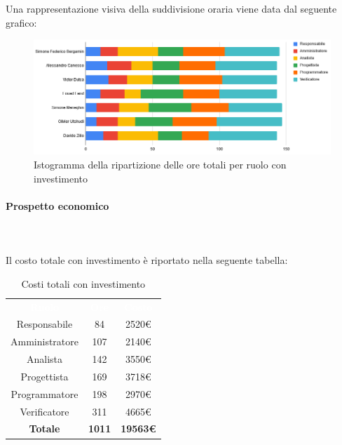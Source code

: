 Una rappresentazione visiva della suddivisione oraria viene data dal seguente grafico:
\begin{figure}[H]
\centering
\includegraphics[scale=0.60]{img/grafici/tabella_tot_con_analisi.png}
\caption{Istogramma della ripartizione delle ore totali per ruolo con investimento}
\end{figure}

\paragraph{Prospetto economico} \mbox{} \\ \mbox{} \\
Il costo totale con investimento è riportato nella seguente tabella:

\begin{table}[H]
\centering\renewcommand{\arraystretch}{1.5}
\caption{Costi totali con investimento}
\vspace{0.2cm}
\begin{tabular}{ c c c }
\rowcolor{redafk}
\textcolor{white}{\textbf{Ruolo}} & \textcolor{white}{\textbf{Ore}} & 
\textcolor{white}{\textbf{Costo}}  \\
Responsabile & 84 & 2520€ \\
Amministratore & 107 & 2140€ \\
Analista & 142 & 3550€ \\
Progettista	& 169 & 3718€ \\
Programmatore & 198 & 2970€  \\
Verificatore & 311 & 4665€  \\
\rowcolor{lastrowcolor}
\textbf{Totale} & \textbf{1011} & \textbf{19563€}  \\
\end{tabular}
\end{table}

